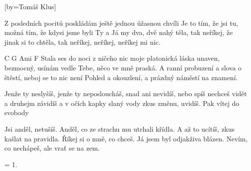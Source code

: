 [by={Tomáš Klus}]

\beginverse{}
Z posledních pocitů poskládám ještě jednou úžasnou chvíli
Je to tím, že jsi tu, možná tím, že kdysi jsme byli Ty a
Já my dva, dvě nahý těla, tak neříkej, že jinak si to chtěla,
tak neříkej, neříkej, neříkej mi nic.
\endverse{}

\beginverse{}
C G Ami F
Stala ses do noci z ničeho nic moje platonická láska
unaven, bezmocný, usínám vedle Tebe, něco ve mně praská.
A ranní probuzení a slova o štěstí, neboj se to nic není
Pohled a okouzlení, a prázdný náměstí na znamení. 
\endverse{}

\beginchorus{}
Jenže ty neslyšíš, jenže ty neposloucháš,
snad ani nevidíš, nebo spíš nechceš vidět
a druhejm závidíš a v očích kapky slaný vody
zkus změnu, uvidíš. Pak vítej do svobody
\endchorus{}

\beginverse{}
Jsi anděl, netušíš. Anděl, co ze strachu mu utrhali křídla.
A až to ucítíš, zkus kašlat na pravidla.
Říkej si o mně, co chceš. Já jsem byl odjakživa blázen.
Nevím, co nechápeš, ale vrať se na zem. 
\endverse{}

\beginchorus{}

\endchorus{}

\beginverse{}
= 1.
\endverse{}

\endsong{}
